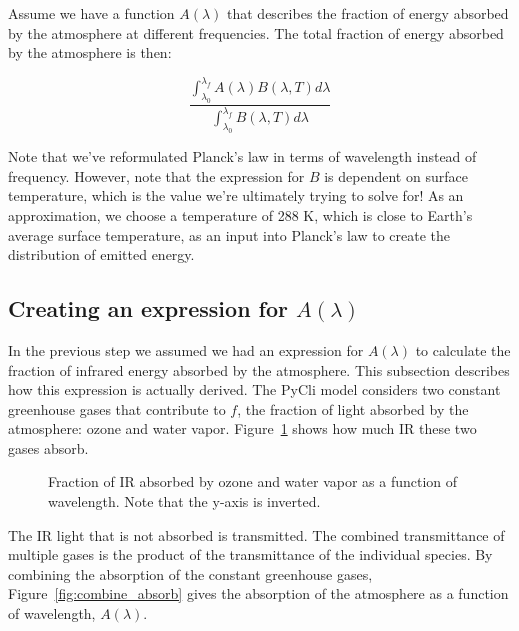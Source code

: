 \documentclass[12pt]{article} %
\begin{document}
Assume we have a function $A(\lambda)$ that describes the fraction of energy absorbed by the atmosphere at different frequencies. The total fraction of energy absorbed by the atmosphere is then:

$$\frac{\int_{\lambda_0}^{\lambda_f} A(\lambda) B(\lambda, T) d\lambda}{\int_{\lambda_0}^{\lambda_f} B(\lambda, T) d\lambda }$$

Note that we've reformulated Planck's law in terms of wavelength instead of frequency. However, note that the expression for $B$ is dependent on surface temperature, which is the value we're ultimately trying to solve for! As an approximation, we choose a temperature of 288 K, which is close to Earth's average surface temperature, as an input into Planck's law to create the distribution of emitted energy.

\subsection{Creating an expression for $A(\lambda)$}

In the previous step we assumed we had an expression for $A(\lambda)$ to calculate the fraction of infrared energy absorbed by the atmosphere. This subsection describes how this expression is actually derived. The PyCli model considers two constant greenhouse gases that contribute to $f$, the fraction of light absorbed by the atmosphere: ozone and water vapor.  Figure~\ref{fig:absorb} shows how much IR these two gases absorb.

\begin{figure}[H]
	\caption{Fraction of IR absorbed by ozone and water vapor as a function of wavelength. Note that the y-axis is inverted.}
	\label{fig:absorb}
\end{figure}

The IR light that is not absorbed is transmitted. The combined transmittance of multiple gases is the product of the transmittance of the individual species. By combining the absorption of the constant greenhouse gases, Figure~\ref{fig:combine_absorb} gives the absorption of the atmosphere as a function of wavelength, $A(\lambda)$.
\end{document}
